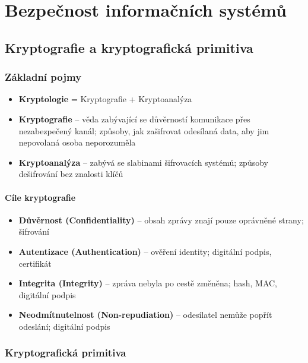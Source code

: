\section{Bezpečnost informačních systémů}

\subsection{Kryptografie a kryptografická primitiva}

\subsubsection{Základní pojmy}

\begin{itemize}
  \item \textbf{Kryptologie} = Kryptografie + Kryptoanalýza
  \item \textbf{Kryptografie} -- věda zabývající se důvěrností komunikace přes nezabezpečený kanál;
    způsoby, jak zašifrovat odesílaná data, aby jim nepovolaná osoba neporozuměla
  \item \textbf{Kryptoanalýza} -- zabývá se slabinami šifrovacích systémů; způsoby dešifrování bez znalosti klíčů
\end{itemize}

\paragraph{Cíle kryptografie}
\begin{itemize}
  \item \textbf{Důvěrnost (Confidentiality)} -- obsah zprávy znají pouze oprávněné strany; šifrování
  \item \textbf{Autentizace (Authentication)} -- ověření identity; digitální podpis, certifikát
  \item \textbf{Integrita (Integrity)} -- zpráva nebyla po cestě změněna; hash, MAC, digitální podpis
  \item \textbf{Neodmítnutelnost (Non-repudiation)} -- odesílatel nemůže popřít odeslání; digitální podpis
\end{itemize}

\subsubsection{Kryptografická primitiva}

